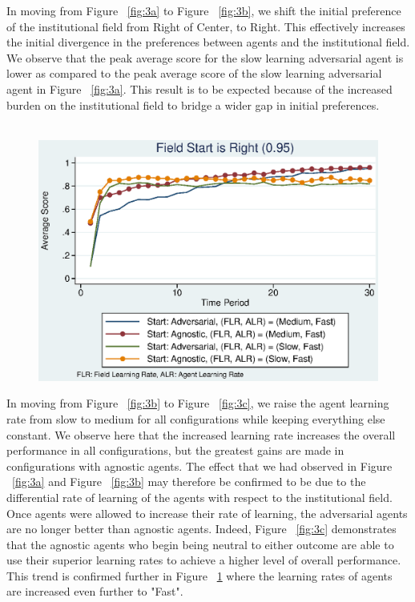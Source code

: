 \documentclass[12pt]{article}
\begin{document}
\noindent In moving from Figure ~\ref{fig:3a} to Figure ~\ref{fig:3b}, we shift the initial preference of the institutional field from Right of Center, to Right. This effectively increases the initial divergence in the preferences between agents and the institutional field. We observe that the peak average score for the slow learning adversarial agent is lower as compared to the peak average score of the slow learning adversarial agent in Figure ~\ref{fig:3a}. This result is to be expected because of the increased burden on the institutional field to bridge a wider gap in initial preferences.\\\\

\begin{figure}[h]
\begin{centering}
  \includegraphics[width=\textwidth]{frcmedium3d}
  \caption{}
  \label{fig:3d}
\end{centering}
\end{figure}

\noindent In moving from Figure ~\ref{fig:3b} to Figure ~\ref{fig:3c}, we raise the agent learning rate from slow to medium for all configurations while keeping everything else constant. We observe here that the increased learning rate increases the overall performance in all configurations, but the greatest gains are made in configurations with agnostic agents. The effect that we had observed in Figure ~\ref{fig:3a} and Figure ~\ref{fig:3b} may therefore be confirmed to be due to the differential rate of learning of the agents with respect to the institutional field. Once agents were allowed to increase their rate of learning, the adversarial agents are no longer better than agnostic agents. Indeed, Figure ~\ref{fig:3c} demonstrates that the agnostic agents who begin being neutral to either outcome are able to use their superior learning rates to achieve a higher level of overall performance. This trend is confirmed further in Figure ~\ref{fig:3d} where the learning rates of agents are increased even further to "Fast".\\\\
\end{document}
